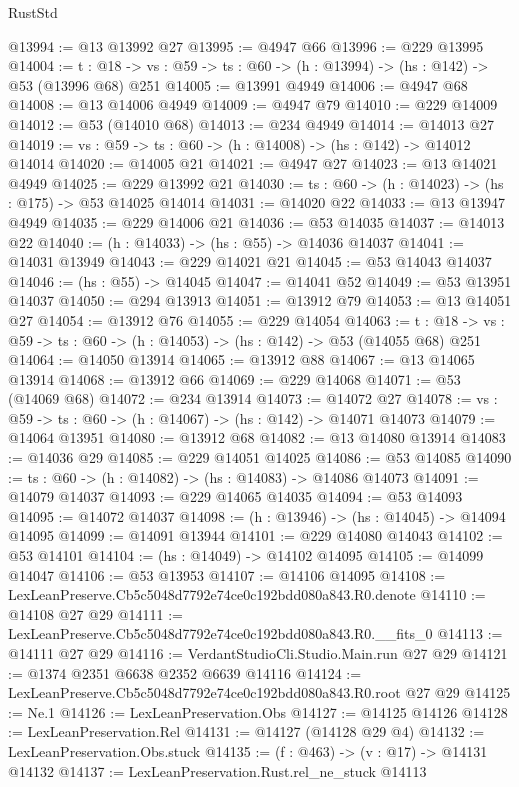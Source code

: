 \begin{lexlean}{RustStd}
\begin{coremodule}
@13994 := @13 @13992 @27
@13995 := @4947 @66
@13996 := @229 @13995
@14004 := {t : @18} ->
  {vs : @59} -> {ts : @60} -> (h : @13994) -> (hs : @142) -> @53 (@13996 @68) @251
@14005 := @13991 @4949
@14006 := @4947 @68
@14008 := @13 @14006 @4949
@14009 := @4947 @79
@14010 := @229 @14009
@14012 := @53 (@14010 @68)
@14013 := @234 @4949
@14014 := @14013 @27
@14019 := {vs : @59} -> {ts : @60} -> (h : @14008) -> (hs : @142) -> @14012 @14014
@14020 := @14005 @21
@14021 := @4947 @27
@14023 := @13 @14021 @4949
@14025 := @229 @13992 @21
@14030 := {ts : @60} -> (h : @14023) -> (hs : @175) -> @53 @14025 @14014
@14031 := @14020 @22
@14033 := @13 @13947 @4949
@14035 := @229 @14006 @21
@14036 := @53 @14035
@14037 := @14013 @22
@14040 := (h : @14033) -> (hs : @55) -> @14036 @14037
@14041 := @14031 @13949
@14043 := @229 @14021 @21
@14045 := @53 @14043 @14037
@14046 := (hs : @55) -> @14045
@14047 := @14041 @52
@14049 := @53 @13951 @14037
@14050 := @294 @13913
@14051 := @13912 @79
@14053 := @13 @14051 @27
@14054 := @13912 @76
@14055 := @229 @14054
@14063 := {t : @18} ->
  {vs : @59} -> {ts : @60} -> (h : @14053) -> (hs : @142) -> @53 (@14055 @68) @251
@14064 := @14050 @13914
@14065 := @13912 @88
@14067 := @13 @14065 @13914
@14068 := @13912 @66
@14069 := @229 @14068
@14071 := @53 (@14069 @68)
@14072 := @234 @13914
@14073 := @14072 @27
@14078 := {vs : @59} -> {ts : @60} -> (h : @14067) -> (hs : @142) -> @14071 @14073
@14079 := @14064 @13951
@14080 := @13912 @68
@14082 := @13 @14080 @13914
@14083 := @14036 @29
@14085 := @229 @14051 @14025
@14086 := @53 @14085
@14090 := {ts : @60} -> (h : @14082) -> (hs : @14083) -> @14086 @14073
@14091 := @14079 @14037
@14093 := @229 @14065 @14035
@14094 := @53 @14093
@14095 := @14072 @14037
@14098 := (h : @13946) -> (hs : @14045) -> @14094 @14095
@14099 := @14091 @13944
@14101 := @229 @14080 @14043
@14102 := @53 @14101
@14104 := (hs : @14049) -> @14102 @14095
@14105 := @14099 @14047
@14106 := @53 @13953
@14107 := @14106 @14095
@14108 := LexLeanPreserve.Cb5c5048d7792e74ce0c192bdd080a843.R0.denote
@14110 := @14108 @27 @29
@14111 := LexLeanPreserve.Cb5c5048d7792e74ce0c192bdd080a843.R0.__fits_0
@14113 := @14111 @27 @29
@14116 := VerdantStudioCli.Studio.Main.run @27 @29
@14121 := @1374 @2351 @6638 @2352 @6639 @14116
@14124 := LexLeanPreserve.Cb5c5048d7792e74ce0c192bdd080a843.R0.root @27 @29
@14125 := Ne.{1}
@14126 := LexLeanPreservation.Obs
@14127 := @14125 @14126
@14128 := LexLeanPreservation.Rel
@14131 := @14127 (@14128 @29 @4)
@14132 := LexLeanPreservation.Obs.stuck
@14135 := (f : @463) -> (v : @17) -> @14131 @14132
@14137 := LexLeanPreservation.Rust.rel_ne_stuck @14113

\end{coremodule}
\end{lexlean}

